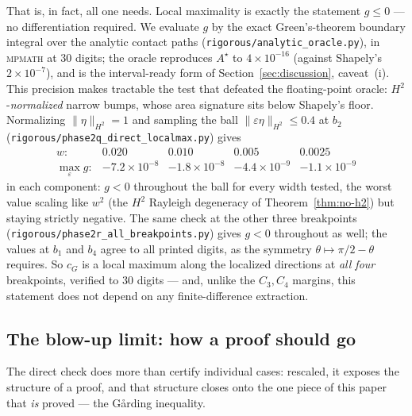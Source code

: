 \documentclass[11pt]{amsart}
\theoremstyle{plain}
\theoremstyle{definition}
\newcommand{\cG}{c_{G}}
\begin{document}
That is, in fact, all one needs.  Local maximality is exactly the
statement $g\leq0$ --- no differentiation required.  We evaluate $g$ by
the exact Green's-theorem boundary integral over the analytic contact
paths (\texttt{rigorous/analytic\_oracle.py}), in \textsc{mpmath} at
$30$ digits; the oracle reproduces $A^{\star}$ to $4\times10^{-16}$
(against Shapely's $2\times10^{-7}$), and is the interval-ready form of
Section~\ref{sec:discussion}, caveat~(i).  This precision makes
tractable the test that defeated the floating-point oracle:
$H^{2}$-\emph{normalized} narrow bumps, whose area signature sits below
Shapely's floor.  Normalizing $\|\eta\|_{H^{2}}=1$ and sampling the ball
$\|\varepsilon\eta\|_{H^{2}}\leq0.4$ at $b_{2}$
(\texttt{rigorous/phase2q\_direct\_localmax.py}) gives
\[
  \begin{array}{lcccc}
    w:            & 0.020 & 0.010 & 0.005 & 0.0025\\
    \max_{\varepsilon}g:  & -7.2{\times}10^{-8} & -1.8{\times}10^{-8}
                          & -4.4{\times}10^{-9} & -1.1{\times}10^{-9}
  \end{array}
\]
in each component: $g<0$ throughout the ball for every width tested, the
worst value scaling like $w^{2}$ (the $H^{2}$ Rayleigh degeneracy of
Theorem~\ref{thm:no-h2}) but staying strictly negative.  The same check
at the other three breakpoints
(\texttt{rigorous/phase2r\_all\_breakpoints.py}) gives $g<0$ throughout
as well; the values at $b_{1}$ and $b_{4}$ agree to all printed digits,
as the symmetry $\theta\mapsto\pi/2-\theta$ requires.  So $\cG$ is a
local maximum along the localized directions at \emph{all four}
breakpoints, verified to $30$ digits --- and, unlike the $C_{3},C_{4}$
margins, this statement does not depend on any finite-difference
extraction.

\subsection{The blow-up limit: how a proof should go}
\label{sec:blowup}

The direct check does more than certify individual cases: rescaled, it
exposes the structure of a proof, and that structure closes onto the one
piece of this paper that \emph{is} proved --- the G\aa rding inequality.
\end{document}
